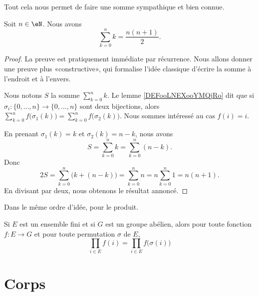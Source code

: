 Tout cela nous permet de faire une somme sympathique et bien connue.
\begin{lemma}
    Soit \( n\in \eN\). Nous avons
    \begin{equation}
        \sum_{k=0}^nk=\frac{ n(n+1) }{ 2 }.
    \end{equation}
\end{lemma}

\begin{proof}
    La preuve est pratiquement immédiate par récurrence. Nous allons donner une preuve plus «constructive», qui formalise l'idée classique d'écrire la somme à l'endroit et à l'envers.


    Nous notons \( S\) la somme \( \sum_{k=0}^nk\). Le lemme \ref{DEFooLNEXooYMQjRo} dit que si \( \sigma_i\colon \{ 0,\ldots, n \}\to \{ 0,\ldots, n \}\) sont deux bijections, alors \( \sum_{k=0}^nf\big( \sigma_1(k) \big)=\sum_{k=0}^nf\big( \sigma_2(k) \big)\). Nous sommes intéressé au cas \( f(i)=i\).

    En prenant \( \sigma_1(k)=k\) et \( \sigma_2(k)=n-k\), nous avons
    \begin{equation}
        S=\sum_{k=0}^nk=\sum_{k=0}^n(n-k).
    \end{equation}
    Donc
    \begin{equation}
        2S=\sum_{k=0}^n\big( k+(n-k) \big)=\sum_{k=0}^nn=n\sum_{k=0}^n1=n(n+1).
    \end{equation}
    En divisant par deux, nous obtenons le résultat annoncé.
\end{proof}

Dans le même ordre d'idée, pour le produit.
\begin{proposition}     \label{PROPooQMUDooQQVRIe}
    Si \( E\) est un ensemble fini et si \( G\) est un groupe abélien, alors pour toute fonction \( f\colon E\to G\) et pour toute permutation \( \sigma\) de \( E\),
    \begin{equation}
        \prod_{i\in E}f(i)=\prod_{i\in E}f\big( \sigma(i) \big)
    \end{equation}
\end{proposition}


\section{Corps}

